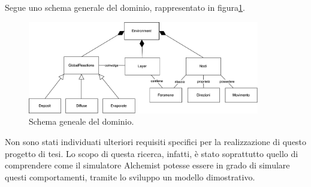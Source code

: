 Segue uno schema generale del dominio, rappresentato in figura\space\ref{fig:generale}.
\begin{figure}[ht]
    \centering
    \includegraphics[width=0.9\textwidth]{figures/generale.png}
    \caption{Schema geneale del dominio.}\label{fig:generale}
\end{figure}\newline

Non sono stati individuati ulteriori requisiti specifici per la realizzazione di questo progetto di tesi.
Lo scopo di questa ricerca, infatti, è stato soprattutto quello di comprendere come il simulatore Alchemist 
potesse essere in grado di simulare questi comportamenti, tramite lo sviluppo un modello
dimostrativo.